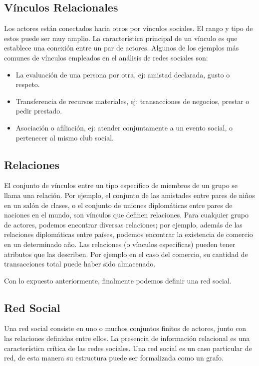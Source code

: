 \subsection{Vínculos Relacionales} %
\label{sub:vinculos_relacionales}
Los actores están conectados hacia otros por vínculos sociales. El rango y tipo de estos puede ser muy amplio. La característica principal de un vínculo es que establece una conexión entre un par de actores. Algunos de los ejemplos más comunes de vínculos empleados en el análisis de redes sociales son:

  \begin{itemize}
    \item La evaluación de una persona por otra, ej: amistad declarada, gusto o respeto.
    \item Transferencia de recursos materiales, ej: transacciones de negocios, prestar o pedir prestado.
    \item Asociación o afiliación, ej: atender conjuntamente a un evento social, o pertenecer al mismo club social.
  \end{itemize}

\subsection{Relaciones} %
\label{sub:relaciones}
El conjunto de vínculos entre un tipo específico de miembros de un grupo se llama una relación. Por ejemplo, el conjunto de las amistades entre pares de niños en un salón de clases, o el conjunto de uniones diplomáticas entre pares de naciones en el mundo, son vínculos que definen relaciones. Para cualquier grupo de actores, podemos encontrar diversas relaciones; por ejemplo, además de las relaciones diplomáticas entre países, podemos encontrar la existencia de comercio en un determinado año. Las relaciones (o vínculos específicas) pueden tener atributos que las describen. Por ejemplo en el caso del comercio, su cantidad de transacciones total puede haber sido almacenado.

Con lo expuesto anteriormente, finalmente podemos definir una red social.

\subsection{Red Social} %
\label{sub:red_social}
Una red social consiste en uno o muchos conjuntos finitos de actores, junto con las relaciones definidas entre ellos. La presencia de información relacional es una característica crítica de las redes sociales. Una red social es un caso particular de red, de esta manera su estructura puede ser formalizada como un grafo.

